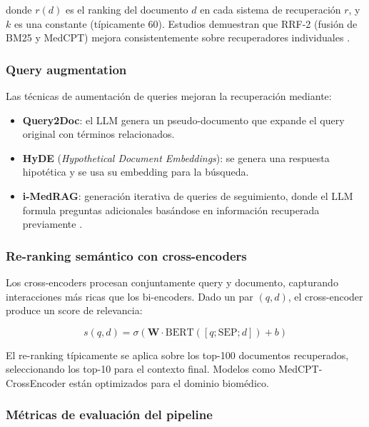 \noindent donde $r(d)$ es el ranking del documento $d$ en cada sistema de recuperación $r$, y $k$ es una constante (típicamente 60). Estudios demuestran que \ac{RRF}-2 (fusión de \ac{BM25} y MedCPT) mejora consistentemente sobre recuperadores individuales \parencite{xiong2024medrag}.

\subsubsection{Query augmentation}

Las técnicas de aumentación de queries mejoran la recuperación mediante:

\begin{itemize}[nosep, leftmargin=*]
    \item \textbf{Query2Doc}: el \ac{LLM} genera un pseudo-documento que expande el query original con términos relacionados.
    \item \textbf{HyDE} (\textit{Hypothetical Document Embeddings}): se genera una respuesta hipotética y se usa su embedding para la búsqueda.
    \item \textbf{i-MedRAG}: generación iterativa de queries de seguimiento, donde el \ac{LLM} formula preguntas adicionales basándose en información recuperada previamente \parencite{xiong2024imedrag}.
\end{itemize}

\subsubsection{Re-ranking semántico con cross-encoders}

Los cross-encoders procesan conjuntamente query y documento, capturando interacciones más ricas que los bi-encoders. Dado un par $(q, d)$, el cross-encoder produce un score de relevancia:

\begin{equation}
s(q, d) = \sigma(\mathbf{W} \cdot \text{BERT}([q; \text{SEP}; d]) + b)
\label{eq:cross_encoder}
\end{equation}

El re-ranking típicamente se aplica sobre los top-100 documentos recuperados, seleccionando los top-10 para el contexto final. Modelos como MedCPT\mbox{-}Cross\-Encoder están optimizados para el dominio biomédico.

\subsubsection{Métricas de evaluación del pipeline}

